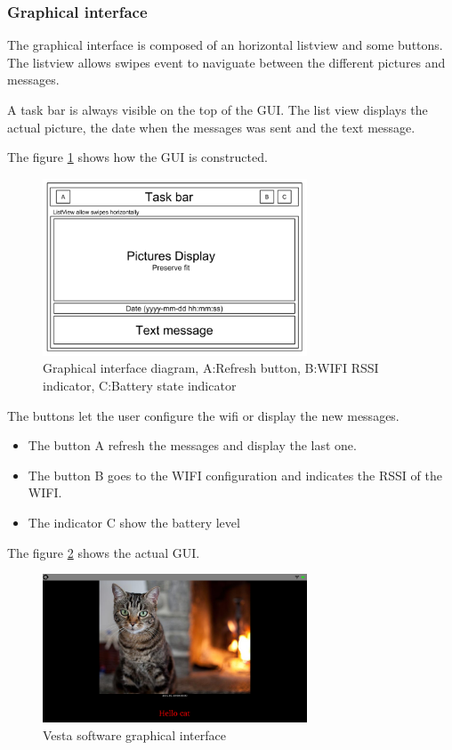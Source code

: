 \clearpage

\subsubsection{Graphical interface}
The graphical interface is composed of an horizontal listview and some buttons. The listview allows swipes event to naviguate between the different pictures and messages.

A task bar is always visible on the top of the GUI. The list view displays the actual picture, the date when the messages was sent and the text message.

The figure \ref{fig:gui diagram} shows how the GUI is constructed.

\begin{figure}[!htb]
    \centering
    \includegraphics[width=0.7\textwidth,keepaspectratio]{chap/softFig/GUI_diagram}
    \caption{Graphical interface diagram, A:Refresh button, B:WIFI RSSI indicator, C:Battery state indicator}
    \label{fig:gui diagram}
\end{figure}

The buttons let the user configure the wifi or display the new messages.

\begin{itemize}
\item{The button A refresh the messages and display the last one.}
\item{The button B goes to the WIFI configuration and indicates the RSSI of the WIFI.}
\item{The indicator C show the battery level}
\end{itemize}

The figure \ref{fig:graphical interface} shows the actual GUI.

\begin{figure}[!htb]
    \centering
    \includegraphics[width=0.7\textwidth,keepaspectratio]{chap/softFig/vesta_printscreen}
    \caption{Vesta software graphical interface}
    \label{fig:graphical interface}
\end{figure}


